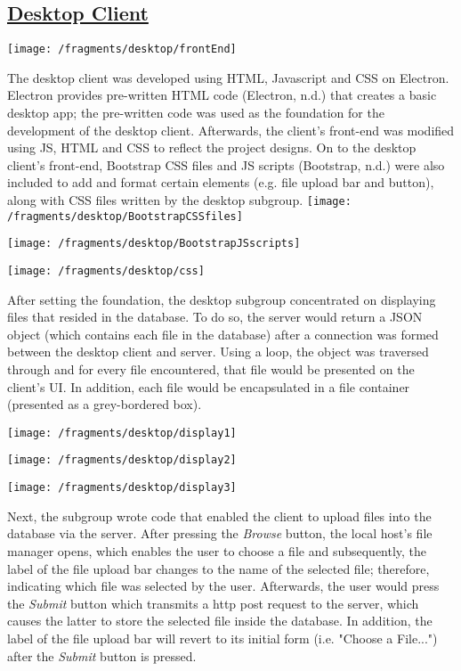 \documentclass{article}
\begin{document}
\subsection{\underline{Desktop Client}}
\texttt{[image: /fragments/desktop/frontEnd]}

The desktop client was developed using  HTML, Javascript and CSS on Electron. Electron provides pre-written HTML code (Electron, n.d.) that creates a basic desktop app; the pre-written code was used as the foundation for the development of the desktop client. Afterwards, the client's front-end was modified using JS, HTML and CSS to reflect the project designs. On to the desktop client's front-end, Bootstrap CSS files and JS scripts (Bootstrap, n.d.) were also included to add and format certain elements (e.g. file upload bar and button), along with CSS files written by the desktop subgroup.
\texttt{[image: /fragments/desktop/BootstrapCSSfiles]}

\texttt{[image: /fragments/desktop/BootstrapJSscripts]}

\texttt{[image: /fragments/desktop/css]}

After setting the foundation, the desktop subgroup concentrated on displaying files that resided in the database. To do so, the server would return a JSON object (which contains each file in the database) after a connection was formed between the desktop client and server. Using a loop, the object was traversed through and for every file encountered, that file would be presented on the client's UI. In addition, each file would be encapsulated in a file container (presented as a grey-bordered box).

\texttt{[image: /fragments/desktop/display1]}

\texttt{[image: /fragments/desktop/display2]}

\texttt{[image: /fragments/desktop/display3]}

Next, the subgroup wrote code that enabled the client to upload files into the database via the server. After pressing the \textit{Browse} button, the local host's file manager opens, which enables the user to choose a file and subsequently, the label of the file upload bar changes to the name of the selected file; therefore, indicating which file was selected by the user. Afterwards, the user would press the \textit{Submit} button which transmits a http post request to the server, which causes the latter to store the selected file inside the database. In addition, the label of the file upload bar will revert to its initial form (i.e. "Choose a File...") after the \textit{Submit} button is pressed. 
\end{document}
